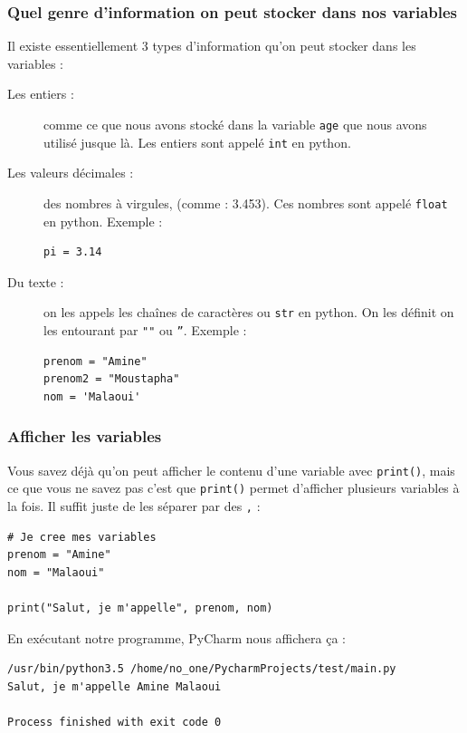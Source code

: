\documentclass[12pt]{article}
\newcommand{\code}[1]{\colorbox{light-gray}{\texttt{#1}}}
\begin{document}
        \subsubsection{Quel genre d'information on peut stocker dans nos variables}
            Il existe essentiellement 3 types d'information qu'on peut stocker dans les variables :
            \begin{description}
                \item[Les entiers :] comme ce que nous avons stocké dans la variable \code{age} que nous avons
                    utilisé jusque là. Les entiers sont appelé \code{int} en python.
                \item[Les valeurs décimales :] des nombres à virgules, (comme : 3.453). Ces nombres sont appelé
                    \code{float} en python. Exemple :
                    \begin{lstlisting}[style=code]
pi = 3.14
                    \end{lstlisting}
                \item[Du texte :] on les appels les chaînes de caractères ou \code{str} en python. On les définit on les
                    entourant par \code{""} ou \code{''}. Exemple :
                    \begin{lstlisting}[style=code]
prenom = "Amine"
prenom2 = "Moustapha"
nom = 'Malaoui'
                    \end{lstlisting}
            \end{description}

        \subsubsection{Afficher les variables}
            Vous savez déjà qu'on peut afficher le contenu d'une variable avec \code{print()}, mais ce que vous
            ne savez pas c'est que \code{print()} permet d'afficher plusieurs variables à la fois. Il suffit
            juste de les séparer par des \code{,} :
            \begin{lstlisting}[style=code]
# Je cree mes variables
prenom = "Amine"
nom = "Malaoui"

print("Salut, je m'appelle", prenom, nom)
            \end{lstlisting}

            En exécutant notre programme, PyCharm nous affichera ça :

            \begin{lstlisting}[style=exec_result]
/usr/bin/python3.5 /home/no_one/PycharmProjects/test/main.py
Salut, je m'appelle Amine Malaoui

Process finished with exit code 0
            \end{lstlisting}
\end{document}
